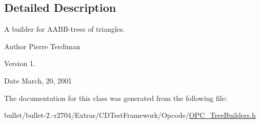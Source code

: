 \subsection{Detailed Description}
A builder for A\+A\+B\+B-\/trees of triangles.

\begin{DoxyAuthor}{Author}
Pierre Terdiman 
\end{DoxyAuthor}
\begin{DoxyVersion}{Version}
1. 
\end{DoxyVersion}
\begin{DoxyDate}{Date}
March, 20, 2001 
\end{DoxyDate}


The documentation for this class was generated from the following file\+:\begin{DoxyCompactItemize}
\item 
bullet/bullet-\/2.-\/r2704/\+Extras/\+C\+D\+Test\+Framework/\+Opcode/\hyperlink{_o_p_c___tree_builders_8h}{O\+P\+C\+\_\+\+Tree\+Builders.\+h}\end{DoxyCompactItemize}
